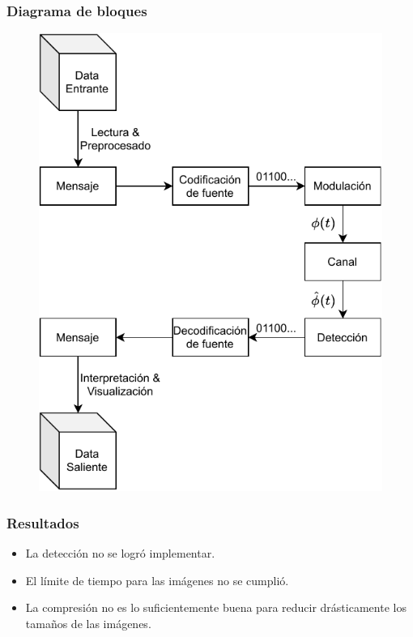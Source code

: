 \documentclass[aspectratio=169]{beamer}
\begin{document}
\begin{frame}

\frametitle{Diagrama de bloques}

\begin{figure}[H]
	\centering
	\includegraphics[width=.5\linewidth]{p2-blocks.pdf}
\end{figure}

\end{frame}


\begin{frame}

\frametitle{Resultados}

\begin{itemize}
	\item La detección no se logró implementar.
	\item El límite de tiempo para las imágenes no se cumplió.
	\item La compresión no es lo suficientemente buena para reducir
	drásticamente los tamaños de las imágenes.
\end{itemize}

\end{frame}

\end{document}
